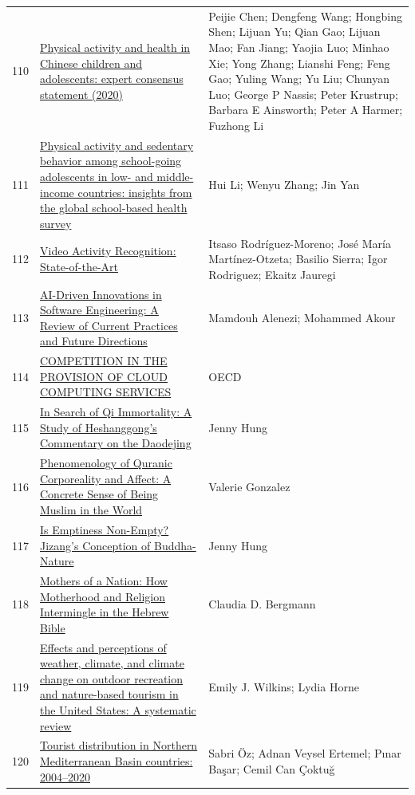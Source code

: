 \documentclass[11pt]{article}
\begin{document}
\begin{longtable}{cp{8cm}p{5cm}}
  110 & \href{https://pubmed.ncbi.nlm.nih.gov/32471813/}{Physical activity and health in Chinese children and adolescents: expert consensus statement (2020)} & Peijie Chen; Dengfeng Wang; Hongbing Shen; Lijuan Yu; Qian Gao; Lijuan Mao; Fan Jiang; Yaojia Luo; Minhao Xie; Yong Zhang; Lianshi Feng; Feng Gao; Yuling Wang; Yu Liu; Chunyan Luo; George P Nassis; Peter Krustrup; Barbara E Ainsworth; Peter A Harmer; Fuzhong Li \\
  111 & \href{https://peerj.com/articles/17097/}{Physical activity and sedentary behavior among school-going adolescents in low- and middle-income countries: insights from the global school-based health survey} & Hui Li; Wenyu Zhang; Jin Yan \\
  112 & \href{https://www.mdpi.com/1424-8220/19/14/3160}{Video Activity Recognition: State-of-the-Art} & Itsaso Rodríguez-Moreno; José María Martínez-Otzeta; Basilio Sierra; Igor Rodriguez; Ekaitz Jauregi \\
  113 & \href{https://www.mdpi.com/2076-3417/15/3/1344}{AI-Driven Innovations in Software Engineering: A Review of Current Practices and Future Directions} & Mamdouh Alenezi; Mohammed Akour \\
  114 & \href{https://www.oecd.org/en/publications/competition-in-the-provision-of-cloud-computing-services_595859c5-en.html}{COMPETITION IN THE PROVISION OF CLOUD COMPUTING SERVICES} & OECD \\
  115 & \href{https://www.mdpi.com/2077-1444/16/3/383}{In Search of Qi Immortality: A Study of Heshanggong's Commentary on the Daodejing} & Jenny Hung \\
  116 & \href{https://www.mdpi.com/2077-1444/14/7/827}{Phenomenology of Quranic Corporeality and Affect: A Concrete Sense of Being Muslim in the World} & Valerie Gonzalez \\
  117 & \href{https://www.mdpi.com/2077-1444/16/2/184}{Is Emptiness Non-Empty? Jizang's Conception of Buddha-Nature} & Jenny Hung \\
  118 & \href{https://www.degruyterbrill.com/document/doi/10.1515/opth-2020-0012/html}{Mothers of a Nation: How Motherhood and Religion Intermingle in the Hebrew Bible} & Claudia D. Bergmann \\
  119 & \href{https://journals.plos.org/climate/article?id=10.1371/journal.pclm.0000266}{Effects and perceptions of weather, climate, and climate change on outdoor recreation and nature-based tourism in the United States: A systematic review} & Emily J. Wilkins; Lydia Horne \\
  120 & \href{https://journals.plos.org/plosone/article?id=10.1371/journal.pone.0293669}{Tourist distribution in Northern Mediterranean Basin countries: 2004–2020} & Sabri Öz; Adnan Veysel Ertemel; Pınar Başar; Cemil Can Çoktuğ \\

\end{longtable}
\end{document}
